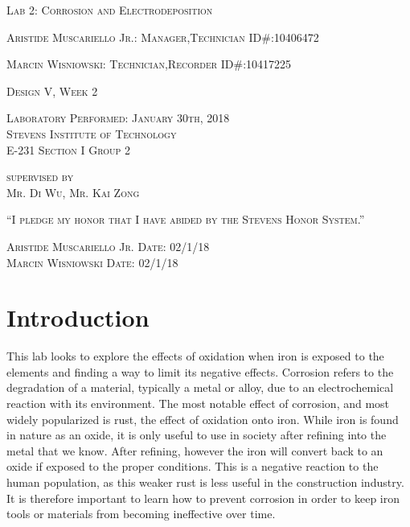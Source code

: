 \documentclass{article}
\begin{document}
\title{}
\begin{titlepage}
    \centering
	{\scshape\LARGE Lab 2: Corrosion and Electrodeposition\par}
	\vspace{1cm}
	{\scshape Aristide Muscariello Jr.: Manager,Technician \hfill ID\#:10406472 \par}
	{\scshape Marcin Wisniowski: Technician,Recorder \hfill ID\#:10417225\par}
	\vfill
	{\scshape Design V, Week 2\par}
	\vspace{.5cm}
	{\scshape Laboratory Performed: January 30th, 2018\\Stevens Institute of Technology\\E-231 Section I Group 2\par}
	\vspace{.5cm}
	{\scshape supervised by\\Mr. Di Wu, Mr. Kai Zong \par}
    \vfill
	{\scshape“I pledge my honor that I have abided by the Stevens Honor System.”\par}
	\vspace{.5cm}
	{\scshape Aristide Muscariello Jr. \hfill Date: 02/1/18\\Marcin Wisniowski \hfill Date: 02/1/18\\}
	\vspace{3cm}
\end{titlepage}

\section{Introduction}
This lab looks to explore the effects of oxidation when iron is exposed to the elements and finding a way to limit its negative effects. Corrosion refers to the degradation of a material, typically a metal or alloy, due to an electrochemical reaction with its environment. The most notable effect of corrosion, and most widely popularized is rust, the effect of oxidation onto iron. While iron is found in nature as an oxide, it is only useful to use in society after refining into the metal that we know. After refining, however the iron will convert back to an oxide if exposed to the proper conditions. This is a negative reaction to the human population, as this weaker rust is less useful in the construction industry. It is therefore important to learn how to prevent corrosion in order to keep iron tools or materials from becoming ineffective over time. 
\end{document}
